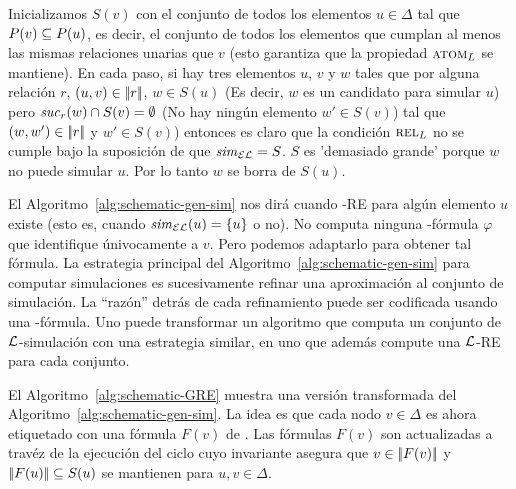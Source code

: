 Inicializamos $S(v)$ con
el conjunto de todos los elementos $u\in\Delta$ tal que $P(v)\subseteq
P(u)$, es decir, el conjunto de todos los elementos que cumplan al menos las
mismas relaciones unarias que $v$ (esto garantiza que la propiedad $\textsc{atom}_L$ se mantiene).
En cada paso, si hay tres elementos $u$, $v$ y $w$ tales que
por alguna relaci\'on $r$, $(u,v) \in |\!|r|\!|$, $w\in S(u)$
(Es decir, $w$ es un candidato para simular $u$) pero ${\it suc}_{r}(w)\cap S(v) = \emptyset$
(No hay ning\'un elemento $w'\in S(v)$) tal que $(w, w') \in |\!|r|\!|$
y $w'\in S(v)$) entonces es claro que la condici\'on $\textsc{rel}_L$ no se cumple
bajo la suposici\'on de que ${\it sim}_\mathcal{EL}=S$. $S$ es 'demasiado grande' porque
$w$ no puede simular $u$. Por lo tanto $w$ se borra de $S(u)$.


El Algoritmo~\ref{alg:schematic-gen-sim} nos dir\'a cuando \EL-RE para alg\'un elemento $u$ existe (esto es, cuando
${\it sim}_{\mathcal{EL}}(u) = \{u\}$ o no). No computa ninguna \EL-f\'ormula $\varphi$ que identifique \'univocamente a $v$. Pero
podemos adaptarlo para obtener tal f\'ormula.
La estrategia principal del Algoritmo~\ref{alg:schematic-gen-sim} para computar simulaciones es sucesivamente refinar una aproximaci\'on al conjunto de simulaci\'on.
La ``raz\'on'' detr\'as de cada refinamiento puede ser codificada usando una \EL-f\'ormula.
Uno puede transformar un algoritmo que computa un conjunto de $\mathcal{L}$-simulaci\'on con una estrategia similar, en uno que adem\'as compute una $\mathcal{L}$-RE para cada conjunto.


El Algoritmo~\ref{alg:schematic-GRE} muestra una versi\'on transformada del 
Algoritmo~\ref{alg:schematic-gen-sim}. La idea es que cada nodo
$v\in\Delta$ es ahora etiquetado con una f\'ormula
$F(v)$ de \EL. Las f\'ormulas $F(v)$ son actualizadas a trav\'ez de la ejecuci\'on del ciclo cuyo invariante asegura que $v \in
|\!|F(v)|\!|$ y $|\!|F(u)|\!| \subseteq S(u)$ se mantienen para
$u,v\in\Delta$.

%
%
%
%


